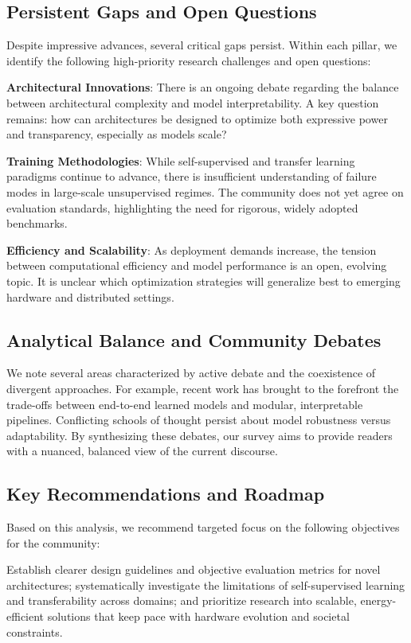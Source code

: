 \documentclass[sigconf]{acmart}
\begin{document}
\subsection{Persistent Gaps and Open Questions}

Despite impressive advances, several critical gaps persist. Within each pillar, we identify the following high-priority research challenges and open questions:

\textbf{Architectural Innovations}: There is an ongoing debate regarding the balance between architectural complexity and model interpretability. A key question remains: how can architectures be designed to optimize both expressive power and transparency, especially as models scale?

\textbf{Training Methodologies}: While self-supervised and transfer learning paradigms continue to advance, there is insufficient understanding of failure modes in large-scale unsupervised regimes. The community does not yet agree on evaluation standards, highlighting the need for rigorous, widely adopted benchmarks.

\textbf{Efficiency and Scalability}: As deployment demands increase, the tension between computational efficiency and model performance is an open, evolving topic. It is unclear which optimization strategies will generalize best to emerging hardware and distributed settings.

\subsection{Analytical Balance and Community Debates}

We note several areas characterized by active debate and the coexistence of divergent approaches. For example, recent work has brought to the forefront the trade-offs between end-to-end learned models and modular, interpretable pipelines. Conflicting schools of thought persist about model robustness versus adaptability. By synthesizing these debates, our survey aims to provide readers with a nuanced, balanced view of the current discourse.

\subsection{Key Recommendations and Roadmap}

Based on this analysis, we recommend targeted focus on the following objectives for the community:

Establish clearer design guidelines and objective evaluation metrics for novel architectures; systematically investigate the limitations of self-supervised learning and transferability across domains; and prioritize research into scalable, energy-efficient solutions that keep pace with hardware evolution and societal constraints.
\end{document}
